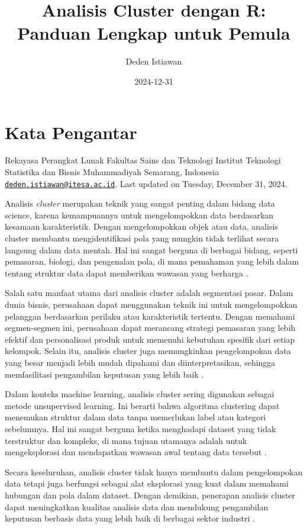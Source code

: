 \documentclass[
  oneside]{book}
\title{Analisis Cluster dengan R: Panduan Lengkap untuk Pemula}
\author{Deden Istiawan}
\date{2024-12-31}
\begin{document}
\maketitle

{
\setcounter{tocdepth}{1}
\tableofcontents
}
\chapter*{Kata Pengantar}\label{kata-pengantar}

Rekayasa Perangkat Lunak
Fakultas Sains dan Teknologi Institut Teknologi Statistika dan
Bisnis Muhammadiyah Semarang, Indonesia
\href{mailto:deden.istiawan@itesa.ac.id}{\nolinkurl{deden.istiawan@itesa.ac.id}}.
Last updated on Tuesday, December 31, 2024.

Analisis \emph{cluster} merupakan teknik yang sangat penting dalam bidang data
science, karena kemampuannya untuk mengelompokkan data berdasarkan
kesamaan karakteristik. Dengan mengelompokkan objek atau data, analisis
cluster membantu mengidentifikasi pola yang mungkin tidak terlihat
secara langsung dalam data mentah. Hal ini sangat berguna di berbagai
bidang, seperti pemasaran, biologi, dan pengenalan pola, di mana
pemahaman yang lebih dalam tentang struktur data dapat memberikan
wawasan yang berharga \citep{kaufman:clustering1990}.

Salah satu manfaat utama dari analisis cluster adalah segmentasi pasar.
Dalam dunia bisnis, perusahaan dapat menggunakan teknik ini untuk
mengelompokkan pelanggan berdasarkan perilaku atau karakteristik
tertentu. Dengan memahami segmen-segmen ini, perusahaan dapat merancang
strategi pemasaran yang lebih efektif dan personalisasi produk untuk
memenuhi kebutuhan spesifik dari setiap kelompok. Selain itu, analisis
cluster juga memungkinkan pengelompokan data yang besar menjadi lebih
mudah dipahami dan diinterpretasikan, sehingga memfasilitasi pengambilan
keputusan yang lebih baik \citep{han2012mining}.

Dalam konteks machine learning, analisis cluster sering digunakan
sebagai metode unsupervised learning. Ini berarti bahwa algoritma
clustering dapat menemukan struktur dalam data tanpa memerlukan label
atau kategori sebelumnya. Hal ini sangat berguna ketika menghadapi
dataset yang tidak terstruktur dan kompleks, di mana tujuan utamanya
adalah untuk mengeksplorasi dan mendapatkan wawasan awal tentang data
tersebut \citep{jain2010}.

Secara keseluruhan, analisis cluster tidak hanya membantu dalam
pengelompokan data tetapi juga berfungsi sebagai alat eksplorasi yang
kuat dalam memahami hubungan dan pola dalam dataset. Dengan demikian,
penerapan analisis cluster dapat meningkatkan kualitas analisis data dan
mendukung pengambilan keputusan berbasis data yang lebih baik di
berbagai sektor industri .
\end{document}
